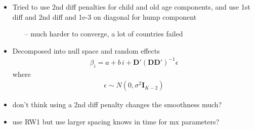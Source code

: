 \documentclass[12pt,a4paper]{article}
\date{\vspace{-5ex}}
\begin{document}
\begin{itemize}
\item Tried to use 2nd diff penalties for child and old age components, and use 1st diff and 2nd diff and 1e-3 on diagonal for hump component
	\begin{itemize}
	\item[--] much harder to converge, a lot of countries failed 
	\end{itemize}
\item Decomposed into null space and random effects
\begin{align*}
\beta_i = a + b \, i + \boldsymbol{D}'(\boldsymbol{D}\boldsymbol{D}')^{-1} \epsilon
\end{align*}
where
\begin{align*}
\epsilon \sim N(0, \sigma ^2 \boldsymbol{I}_{K-2})
\end{align*}
\item don't think using a 2nd diff penalty changes the smoothness much?
\item use RW1 but use larger spacing knows in time for mx parameters?
\end{itemize}
\end{document}
